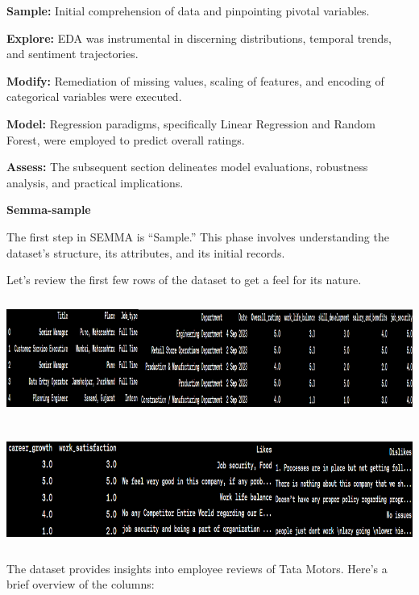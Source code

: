 \documentclass[
]{article}
\newcommand{\textcenter}[1]{\begin{center} \vspace{10px}\textbf{\large #1} \end{center}}
\begin{document}
\textbf{Sample:} Initial comprehension of data and pinpointing pivotal variables.

\textbf{Explore:} EDA was instrumental in discerning distributions, temporal trends, and sentiment trajectories.

\textbf{Modify:} Remediation of missing values, scaling of features, and encoding of categorical variables were executed.

\textbf{Model:} Regression paradigms, specifically Linear Regression and Random Forest, were employed to predict overall ratings.

\textbf{Assess:} The subsequent section delineates model evaluations, robustness analysis, and practical implications.

\textcenter{Semma-sample}

The first step in SEMMA is ``Sample.'' This phase involves understanding
the dataset's structure, its attributes, and its initial records.

Let's review the first few rows of the dataset to get a feel for its
nature.

\includegraphics[width=5.26806in,height=1.51181in]{image1.png}


\includegraphics[width=5.26806in,height=1.47569in]{image2.png}


The dataset provides insights into employee reviews of Tata Motors.
Here's a brief overview of the columns:
\end{document}
